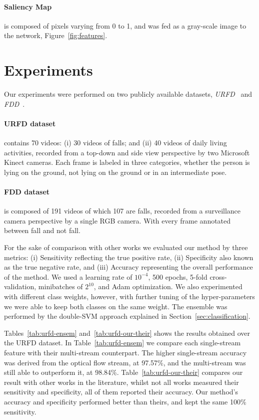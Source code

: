 \documentclass[conference]{IEEEtran}
\begin{document}
\paragraph{Saliency Map} is composed of pixels varying from 0 to 1, and was fed as a gray-scale image to the network, Figure~\ref{fig:features}.

\section{Experiments}
\label{sec:experiments}

Our experiments were performed on two publicly available datasets, \textit{URFD}~\cite{kepski2014human} and \textit{FDD}~\cite{charfi2013optimised}.

\paragraph{URFD dataset} contains 70 videos: (i) 30 videos of falls; and (ii) 40 videos of daily living activities, recorded from a top-down and side view perspective by two Microsoft Kinect cameras. Each frame is labeled in three categories, whether the person is lying on the ground, not lying on the ground or in an intermediate pose.
\paragraph{FDD dataset} is composed of 191 videos of which 107 are falls, recorded from a surveillance camera perspective by a single RGB camera. With every frame annotated between fall and not fall.

For the sake of comparison with other works we evaluated our method by three metrics: (i) Sensitivity reflecting the true positive rate, (ii) Specificity also known as the true negative rate, and (iii) Accuracy representing the overall performance of the method. We used a learning rate of $10^{-4}$, 500 epochs, 5-fold cross-validation, minibatches of $2^{10}$, and Adam optimization. We also experimented with different class weights, however, with further tuning of the hyper-parameters we were able to keep both classes on the same weight. The ensemble was performed by the double-SVM approach explained in Section~\ref{sec:classification}.

Tables~\ref{tab:urfd-ensem} and~\ref{tab:urfd-our-their} shows the results obtained over the URFD dataset. In Table~\ref{tab:urfd-ensem} we compare each single-stream feature with their multi-stream counterpart. The higher single-stream accuracy was derived from the optical flow stream, at 97.57\%, and the multi-stream was still able to outperform it, at 98.84\%. Table~\ref{tab:urfd-our-their} compares our result with other works in the literature, whilst not all works measured their sensitivity and specificity, all of them reported their accuracy. Our method's accuracy and specificity performed better than theirs, and kept the same 100\% sensitivity.
\end{document}
